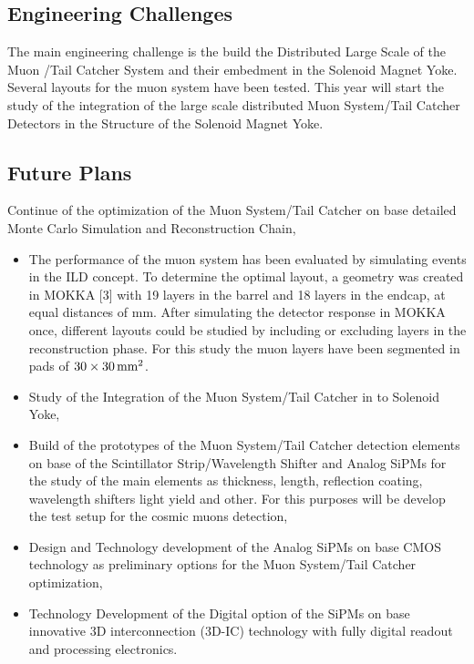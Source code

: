 \subsection{Engineering Challenges}
The main engineering challenge is the build the Distributed Large Scale of the Muon /Tail Catcher System and their embedment in the Solenoid Magnet Yoke.
Several layouts for the muon system have been tested.
This year will start the study of the integration of the large scale distributed Muon System/Tail Catcher Detectors in the Structure of the Solenoid Magnet Yoke.

\subsection{Future Plans}
Continue of the optimization of the Muon System/Tail Catcher on base detailed Monte Carlo Simulation and Reconstruction Chain,
\begin{itemize}
\item The performance of the muon system has been evaluated by simulating events in the ILD concept. To determine the optimal layout,
a geometry was created in MOKKA [3] with 19 layers in the barrel and 18 layers in the endcap, at equal distances of \unit[140]{mm}. After simulating the detector response
in  MOKKA once, different layouts could be studied by including or excluding layers in the reconstruction phase. For this study the muon layers have been segmented in pads of $30\times\unit[30]{mm^2}$.

\item Study of the Integration of the Muon System/Tail Catcher in to Solenoid Yoke,
\item Build of the prototypes of the Muon System/Tail Catcher detection elements on base of the Scintillator Strip/Wavelength Shifter and Analog SiPMs for the study of the main elements as thickness, length, reflection coating, wavelength shifters light yield and other. For this purposes will be develop the test setup for the cosmic muons detection,
\item Design and Technology development of the Analog SiPMs on base CMOS technology as preliminary options for the Muon System/Tail Catcher optimization,
\item Technology Development of the Digital option of the SiPMs on base innovative 3D interconnection (3D-IC) technology with fully digital readout and processing electronics.
\end{itemize}

